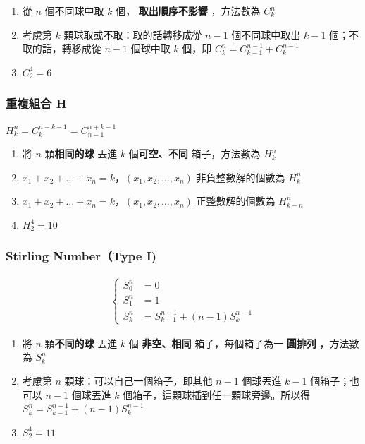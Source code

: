\documentclass[10pt,oneside]{article}
\begin{document}
\begin{landscape}
\begin{multicols}{2}
{\begin{enumerate}
	\item 從 $n$ 個不同球中取 $k$ 個， \textbf{取出順序不影響} ，方法數為 $C^n_k$
	\item 考慮第 $k$ 顆球取或不取：取的話轉移成從 $n-1$ 個不同球中取出 $k-1$ 個；不取的話，轉移成從 $n-1$ 個球中取 $k$ 個，即 $C^n_k = C^{n-1}_{k-1} + C^{n-1}_{k}$
	\item $C^4_2 = 6$
\end{enumerate}
}

\subsubsection{重複組合 H}
{\normalsize
$H^n_k = C^{n+k-1}_k = C^{n+k-1}_{n-1}$

\begin{enumerate}
	\item 將 $n$ 顆\textbf{相同的球} 丟進 $k$ 個\textbf{可空、不同} 箱子，方法數為 $H^n_k$
	\item $x_1 + x_2 + \dots + x_n = k$，$(x_1, x_2, \dots, x_n)$ 非負整數解的個數為 $H^n_k$
	\item $x_1 + x_2 + \dots + x_n = k$，$(x_1, x_2, \dots, x_n)$ 正整數解的個數為 $H^n_{k - n}$
	\item $H^4_2 = 10$
\end{enumerate}
}

\subsubsection{Stirling Number（Type I)}
{\normalsize
\begin{equation}
\begin{split}
\begin{cases}
	S^n_0 &=0 \\
    	S^n_1 &=1 \\
    	S^n_k &= S^{n-1}_{k-1} + (n-1) S^{n-1}_{k}
\end{cases}
\end{split}
\end{equation}

\begin{enumerate}
	\item 將 $n$ 顆\textbf{不同的球} 丟進 $k$ 個 \textbf{非空、相同} 箱子，每個箱子為一 \textbf{圓排列} ，方法數為 $S^n_k$
	\item 考慮第 $n$ 顆球：可以自己一個箱子，即其他 $n-1$ 個球丟進 $k-1$ 個箱子；也可以 $n-1$ 個球丟進 $k$ 個箱子，這顆球插到任一顆球旁邊。所以得 $S^n_k = S^{n-1}_{k-1} + (n-1) S^{n-1}_{k}$
	\item $S^4_2 = 11$
\end{enumerate}
}


\end{multicols}
\end{landscape}
\end{document}
